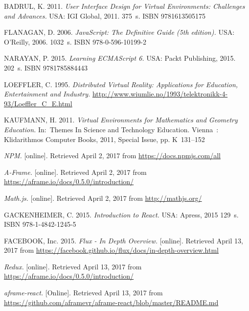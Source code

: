 \begin{thebibliography}{1}

BADRUL, K. 2011. \emph{User Interface Design for Virtual Environments: Challenges and Advances.} USA: IGI Global, 2011. 375~s. ISBN 9781613505175

FLANAGAN, D. 2006. \emph{JavaScript: The Definitive Guide (5th edition).} USA: O'Reilly, 2006. 1032~s. ISBN 978-0-596-10199-2

NARAYAN, P. 2015. \emph{Learning ECMAScript 6.} USA: Packt Publishing, 2015. 202~s. ISBN 9781785884443

LOEFFLER, C. 1995. \emph{Distributed Virtual Reality: Applications for Education, Entertainment and Industry.} \url{http://www.wiumlie.no/1993/telektronikk-4-93/Loeffler_C_E.html}

KAUFMANN, H. 2011. \emph{Virtual Environments for Mathematics and Geometry Education.} In:~Themes In Science and Technology Education. Vienna~: Klidarithmos Computer Books, 2011, Special Issue, pp. K~131--152

\emph{NPM.} [online]. Retrieved April 2, 2017 from \url{https://docs.npmjs.com/all}

\emph{A-Frame.} [online]. Retrieved April 2, 2017 from \url{https://aframe.io/docs/0.5.0/introduction/}

\emph{Math.js.} [online]. Retrieved April 2, 2017 from \url{http://mathjs.org/}

GACKENHEIMER, C. 2015. \emph{Introduction to React.} USA: Apress, 2015 129~s. ISBN 978-1-4842-1245-5

FACEBOOK, Inc. 2015. \emph{Flux - In Depth Overview.} [online]. Retrieved April 13, 2017 from \url{https://facebook.github.io/flux/docs/in-depth-overview.html}

\emph{Redux.} [online]. Retrieved April 13, 2017 from \url{https://aframe.io/docs/0.5.0/introduction/}

\emph{aframe-react.} [Online]. Retrieved April 13, 2017 from \url{https://github.com/aframevr/aframe-react/blob/master/README.md}


\end{thebibliography}
